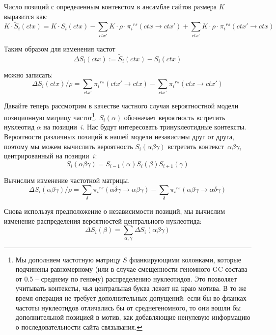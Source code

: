 \documentclass[a4paper]{article}
\newcommand\rs{{}^{rs}}
\begin{document}
Число позиций с определенным контекстом в ансамбле сайтов размера $K$ выразится как:
\begin{equation}
K\cdot\widetilde{S}_i(ctx) = K\cdot S_i(ctx) - \sum_{ctx'} K\cdot\rho\cdot \pi_i\rs(ctx \to ctx') + \sum_{ctx'} K\cdot\rho\cdot \pi_i\rs(ctx' \to ctx)
\end{equation}

Таким образом для изменения частот
\begin{equation*}
\Delta S_i(ctx) := \widetilde{S}_i(ctx) - S_i(ctx)
\end{equation*}

можно записать:
\begin{equation}
\Delta S_i(ctx) / \rho = \sum_{ctx'} \pi_i\rs(ctx'\to ctx) - \sum_{ctx'} \pi_i\rs(ctx\to ctx')
\end{equation}

Давайте теперь рассмотрим в качестве частного случая вероятностной модели позиционную матрицу частот\footnote{Мы дополняем частотную матрицу $S$ фланкирующими колонками, которые подчинены равномерному (или в случае смещенности геномного GC-состава от 0.5 -- среднему по геному) распределению нуклеотидов. Это позволяет учитывать контексты, чья центральная буква лежит на краю мотива. В то же время операция не требует дополнительных допущений: если бы во фланках частоты нуклеотидов отличались бы от среднегеномного, то они вошли бы дополнительной позицией в мотив, как добавляющие ненулевую информацию о последовательности сайта связывания.}.
$S_i(\alpha)$ обозначает вероятность встретить нуклеотид $\alpha$ на позиции~$i$. Нас будут интересовать тринуклеотидные контексты. Вероятности различных позиций в нашей модели независимы друг от друга, поэтому мы можем вычислить вероятность $S_i(\alpha\beta\gamma)$ встретить контекст~$\alpha\beta\gamma$, центрированный на позиции~$i$:
\begin{equation*}
S_i(\alpha\beta\gamma) = S_{i-1}(\alpha)S_i(\beta)S_{i+1}(\gamma)
\end{equation*}

Вычислим изменение частотной матрицы.
\begin{equation}
\Delta S_i(\alpha\beta\gamma) / \rho = \sum_{\delta} \pi_i\rs(\alpha\delta\gamma \to \alpha\beta\gamma) - \sum_{\delta} \pi_i\rs(\alpha\beta\gamma \to \alpha\delta\gamma)
\end{equation}

Снова используя предположение о независимости позиций, мы вычислим изменение распределения вероятностей центрального нуклеотида:
\begin{equation}
\Delta S_i(\beta) = \sum_{\alpha, \gamma}\Delta S_i(\alpha\beta\gamma)
\end{equation}
\end{document}
